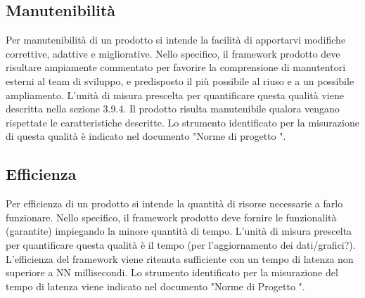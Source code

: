 	\subsection{Manutenibilità}
	\begin{description}
		Per manutenibilità di un prodotto si intende la facilità di apportarvi modifiche correttive, adattive e migliorative.
		Nello specifico, il framework prodotto deve risultare ampiamente commentato per favorire la comprensione di manutentori esterni al team di sviluppo, e predisposto il più possibile al riuso e a un possibile ampliamento.
		L'unità di misura prescelta per quantificare questa qualità viene descritta nella sezione 3.9.4. Il prodotto risulta manutenibile qualora vengano rispettate le caratteristiche descritte.
		Lo strumento identificato per la misurazione di questa qualità è indicato nel documento "Norme di progetto \lastversion".
	\end{description}
	\subsection{Efficienza}
	\begin{description}
		Per efficienza di un prodotto si intende la quantità di risorse necessarie a farlo funzionare.
		Nello specifico, il framework prodotto deve fornire le funzionalità (garantite) impiegando la minore quantità di tempo.
		L'unità di misura prescelta per quantificare questa qualità è il tempo (per l'aggiornamento dei dati/grafici?). L'efficienza del framework viene ritenuta sufficiente con un tempo di latenza non superiore a NN millisecondi.
		Lo strumento identificato per la misurazione del tempo di latenza viene indicato nel documento "Norme di Progetto \lastversion".
	\end{description}